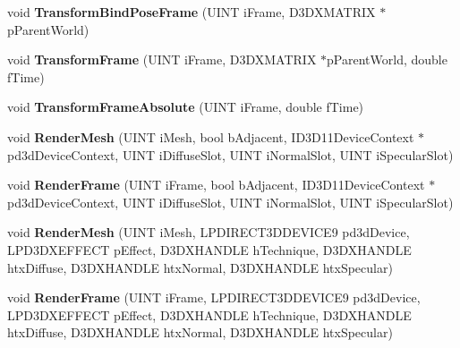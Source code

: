 \begin{DoxyCompactItemize}
\item 
\hypertarget{class_c_d_x_u_t_s_d_k_mesh_a232307e2217d56c1faabd49c180bc09a}{void {\bfseries Transform\+Bind\+Pose\+Frame} (U\+I\+N\+T i\+Frame, D3\+D\+X\+M\+A\+T\+R\+I\+X $\ast$p\+Parent\+World)}\label{class_c_d_x_u_t_s_d_k_mesh_a232307e2217d56c1faabd49c180bc09a}

\item 
\hypertarget{class_c_d_x_u_t_s_d_k_mesh_a2fcf1d94e0b50cec6cedb7c29bfbbc17}{void {\bfseries Transform\+Frame} (U\+I\+N\+T i\+Frame, D3\+D\+X\+M\+A\+T\+R\+I\+X $\ast$p\+Parent\+World, double f\+Time)}\label{class_c_d_x_u_t_s_d_k_mesh_a2fcf1d94e0b50cec6cedb7c29bfbbc17}

\item 
\hypertarget{class_c_d_x_u_t_s_d_k_mesh_acc6e533263b274e73c42e238b47076c9}{void {\bfseries Transform\+Frame\+Absolute} (U\+I\+N\+T i\+Frame, double f\+Time)}\label{class_c_d_x_u_t_s_d_k_mesh_acc6e533263b274e73c42e238b47076c9}

\item 
\hypertarget{class_c_d_x_u_t_s_d_k_mesh_a8120a20e57d88b6640e39286dc3582b0}{void {\bfseries Render\+Mesh} (U\+I\+N\+T i\+Mesh, bool b\+Adjacent, I\+D3\+D11\+Device\+Context $\ast$pd3d\+Device\+Context, U\+I\+N\+T i\+Diffuse\+Slot, U\+I\+N\+T i\+Normal\+Slot, U\+I\+N\+T i\+Specular\+Slot)}\label{class_c_d_x_u_t_s_d_k_mesh_a8120a20e57d88b6640e39286dc3582b0}

\item 
\hypertarget{class_c_d_x_u_t_s_d_k_mesh_a2df34283c0b4862833484f5a1e571637}{void {\bfseries Render\+Frame} (U\+I\+N\+T i\+Frame, bool b\+Adjacent, I\+D3\+D11\+Device\+Context $\ast$pd3d\+Device\+Context, U\+I\+N\+T i\+Diffuse\+Slot, U\+I\+N\+T i\+Normal\+Slot, U\+I\+N\+T i\+Specular\+Slot)}\label{class_c_d_x_u_t_s_d_k_mesh_a2df34283c0b4862833484f5a1e571637}

\item 
\hypertarget{class_c_d_x_u_t_s_d_k_mesh_a307b9eec26899d20e4f6d4524df58269}{void {\bfseries Render\+Mesh} (U\+I\+N\+T i\+Mesh, L\+P\+D\+I\+R\+E\+C\+T3\+D\+D\+E\+V\+I\+C\+E9 pd3d\+Device, L\+P\+D3\+D\+X\+E\+F\+F\+E\+C\+T p\+Effect, D3\+D\+X\+H\+A\+N\+D\+L\+E h\+Technique, D3\+D\+X\+H\+A\+N\+D\+L\+E htx\+Diffuse, D3\+D\+X\+H\+A\+N\+D\+L\+E htx\+Normal, D3\+D\+X\+H\+A\+N\+D\+L\+E htx\+Specular)}\label{class_c_d_x_u_t_s_d_k_mesh_a307b9eec26899d20e4f6d4524df58269}

\item 
\hypertarget{class_c_d_x_u_t_s_d_k_mesh_ab309ffa5a220352572535fc933a0ec88}{void {\bfseries Render\+Frame} (U\+I\+N\+T i\+Frame, L\+P\+D\+I\+R\+E\+C\+T3\+D\+D\+E\+V\+I\+C\+E9 pd3d\+Device, L\+P\+D3\+D\+X\+E\+F\+F\+E\+C\+T p\+Effect, D3\+D\+X\+H\+A\+N\+D\+L\+E h\+Technique, D3\+D\+X\+H\+A\+N\+D\+L\+E htx\+Diffuse, D3\+D\+X\+H\+A\+N\+D\+L\+E htx\+Normal, D3\+D\+X\+H\+A\+N\+D\+L\+E htx\+Specular)}\label{class_c_d_x_u_t_s_d_k_mesh_ab309ffa5a220352572535fc933a0ec88}

\end{DoxyCompactItemize}
